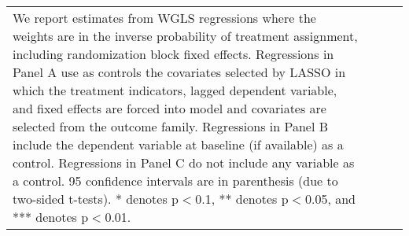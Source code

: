 \begin{table}[H]
\begin{tabular}{@{\extracolsep{0pt}}lccc}
{{  We report estimates from WGLS regressions where the weights are in the inverse probability of treatment 
  assignment, including randomization block fixed effects. 
  Regressions in Panel A use as controls the covariates selected by LASSO in which the treatment indicators,
  lagged dependent variable, and fixed effects are forced into model and covariates are selected from the outcome family.
  Regressions in Panel B include the dependent variable at baseline (if available) as a control. 
  Regressions in Panel C do not include any variable as a control. 
  95\4 confidence intervals are in parenthesis (due to two-sided t-tests). 
  * denotes p$<$0.1, ** denotes p$<$0.05, and *** denotes p$<$0.01.}} \\\end{tabular} \end{table} 